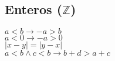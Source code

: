 \subsection{Enteros ($\mathbb{Z}$)}
$a < b \rightarrow -a > b$\\
$a < 0 \rightarrow -a > 0$\\
$|x - y| = |y - x|$\\
$ a < b \land c < b \rightarrow b + d > a + c $\\